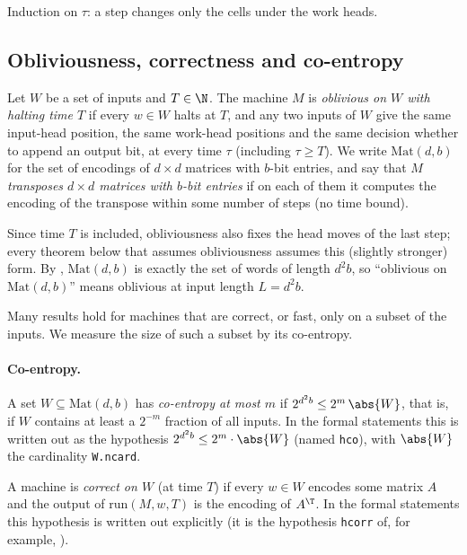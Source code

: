 \begin{outline}
Induction on $\tau$: a step changes only the cells under the work heads.
\end{outline}

\subsection{Obliviousness, correctness and co-entropy}\label{sec:obl}

\begin{definition}\label{def:obl}
Let $W$ be a set of inputs and $T\in\N$. The machine $M$ is \emph{oblivious on $W$ with halting
time $T$} if every $w\in W$ halts at $T$, and any two inputs of $W$ give the same input-head
position, the same work-head positions and the same decision whether to append an output bit, at
every time $\tau$ (including $\tau\ge T$). We write $\mathrm{Mat}(d,b)$ for the set of encodings of
$d\times d$ matrices with $b$-bit entries, and say that $M$ \emph{transposes $d\times d$ matrices
with $b$-bit entries} if on each of them it computes the encoding of the transpose within some
number of steps (no time bound).
\end{definition}

Since time $T$ is included, obliviousness also fixes the head moves of the last step; every
theorem below that assumes obliviousness assumes this (slightly stronger) form. By
, $\mathrm{Mat}(d,b)$ is exactly the set of words of length $d^2b$, so
``oblivious on $\mathrm{Mat}(d,b)$'' means oblivious at input length $L=d^2b$.

Many results hold for machines that are correct, or fast, only on a subset of the inputs. We
measure the size of such a subset by its co-entropy.

\paragraph{Co-entropy.}\label{def:coent} A set $W\subseteq\mathrm{Mat}(d,b)$ has \emph{co-entropy at most $m$} if
$2^{d^2b}\le 2^m\,\abs{W}$, that is, if $W$ contains at least a $2^{-m}$ fraction of all inputs. In the formal
statements this is written out as the hypothesis $2^{d^2b}\le2^m\cdot\abs{W}$ (named \texttt{hco}), with
$\abs{W}$ the cardinality \texttt{W.ncard}.

A machine is \emph{correct on $W$} (at time $T$) if every $w\in W$ encodes some matrix $A$ and the
output of $\mathrm{run}(M,w,T)$ is the encoding of $A^{\T}$. In the formal statements this
hypothesis is written out explicitly (it is the hypothesis \texttt{hcorr} of, for example,
).

